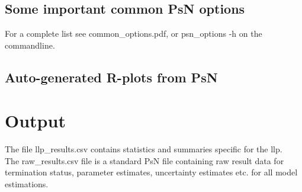 \subsection{Some important common PsN options}
For a complete list see common\_options.pdf, 
or psn\_options -h on the commandline.


\subsection{Auto-generated R-plots from PsN}
\newcommand{\rplotsconditions}{The default llp template 
requires the R libraries ggplot2, reshape and plyr.
If the packages are not installed then no pdf will be generated,
see the .Rout file in the main run directory for error messages.}



\section{Output}

The file llp\_results.csv contains statistics and summaries specific for the llp. \\
The raw\_results.csv file is a standard PsN file containing raw result data for termination status, parameter estimates, uncertainty estimates etc. for all model estimations. 


